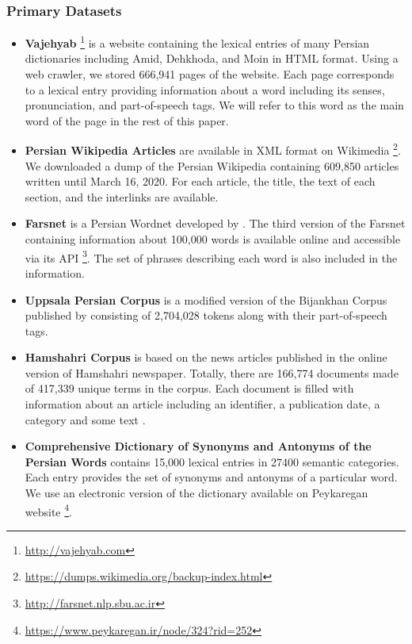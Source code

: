 \documentclass{article}
\begin{document}
\subsubsection{Primary Datasets}
\begin{itemize}
	\item \textbf{Vajehyab} \footnote{\url{http://vajehyab.com}} is a website containing the lexical entries of many Persian dictionaries including Amid, Dehkhoda, and Moin in HTML format. Using a web crawler, we stored 666,941 pages of the website.
	Each page corresponds to a lexical entry providing information about a word including its senses, pronunciation, and part-of-speech tags. We will refer to this word as the main word of the page in the rest of this paper.
	\item \textbf{Persian Wikipedia Articles} are available in XML format on Wikimedia \footnote{\url{https://dumps.wikimedia.org/backup-index.html}}. 
	We downloaded a dump of the Persian Wikipedia containing 609,850 articles written until March 16, 2020. For each article, the title, the text of each section, and the interlinks are available.
	\item \textbf{Farsnet} is a Persian Wordnet developed by 
	\citet{shamsfard2010semi}. The third version of the Farsnet containing information about 100,000 words is available online and accessible via its API \footnote{\url{http://farsnet.nlp.sbu.ac.ir}}. The set of phrases describing each word is also included in the information.
	\item \textbf{Uppsala Persian Corpus}
	is a modified version of the Bijankhan Corpus \citep{bijankhan2004role} published by
	\citet{seraji2015morphosyntactic} consisting of 2,704,028 tokens along with their part-of-speech tags.
	\item \textbf{Hamshahri Corpus}
	is based on the news articles published in the online version of Hamshahri newspaper. Totally, there are 166,774 documents made of 417,339 unique terms in the corpus. Each document is filled with information about an article including an identifier, a publication date, a category and some text \citep{aleahmad2009hamshahri}.
	\item \textbf{Comprehensive Dictionary of Synonyms and Antonyms of the Persian Words} contains 15,000 lexical entries in 27400 semantic categories. Each entry provides the set of synonyms and antonyms of a particular word. We use an electronic version of the dictionary available on Peykaregan website \footnote{\url{https://www.peykaregan.ir/node/324?rid=252}}.
	
\end{itemize}
\end{document}
